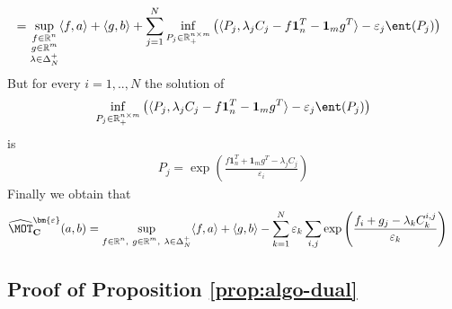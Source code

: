 \begin{prv*}
\begin{align*}
    & = \sup\limits_{\substack{f\in\mathbb{R}^n\\g\in\mathbb{R}^m\\\lambda\in\Delta_N^{+}}} \langle f,a \rangle + \langle g, b \rangle + \sum_{j=1}^N\inf_{P_j\in\mathbb{R}_+^{n\times m}}\left(\langle P_j,\lambda_jC_j-f\mathbf{1}_n^T - \mathbf{1}_m g^T\rangle -\varepsilon_j \ent(P_j) \right)
\end{align*}
But for every $i=1,..,N$ the solution of 
\begin{align*}
    \inf_{P_j\in\mathbb{R}_+^{n\times m}}\left(\langle P_j,\lambda_jC_j-f\mathbf{1}_n^T - \mathbf{1}_m g^T\rangle -\varepsilon_j \ent(P_j)\right)
\end{align*}
is
\begin{align*}
  P_j = \exp\left(\frac{f\mathbf{1}_n^T + \mathbf{1}_m g^T-\lambda_j C_j}{\varepsilon_i}\right)
\end{align*}
Finally we obtain that
\begin{align*}
    \widehat{\MOT}^{\bm{\varepsilon}}_{\mathbf{C}}(a,b)
    &= \sup\limits_{\substack{f\in\mathbb{R}^n,~g\in\mathbb{R}^m,~\lambda\in\Delta_N^{+}}} \langle f,a \rangle + \langle g, b \rangle  - \sum_{k=1}^N \varepsilon_k \sum_{i,j} \exp\left(\frac{f_i+g_j-\lambda_k C_k^{i,j}}{\varepsilon_k}\right)
\end{align*}
\end{prv*}

\subsection{Proof of Proposition \ref{prop:algo-dual}}

